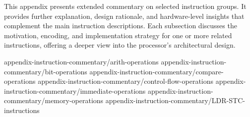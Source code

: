 
This appendix presents extended commentary on selected instruction groups. It provides further explanation, design rationale, and hardware-level insights that complement the main instruction descriptions. Each subsection discusses the motivation, encoding, and implementation strategy for one or more related instructions, offering a deeper view into the processor’s architectural design.

 {appendix-instruction-commentary/arith-operations}
 {appendix-instruction-commentary/bit-operations}
 {appendix-instruction-commentary/compare-operations}
 {appendix-instruction-commentary/control-flow-operations}
 {appendix-instruction-commentary/immediate-operations}
 {appendix-instruction-commentary/memory-operations}
 {appendix-instruction-commentary/LDR-STC-instructions}
